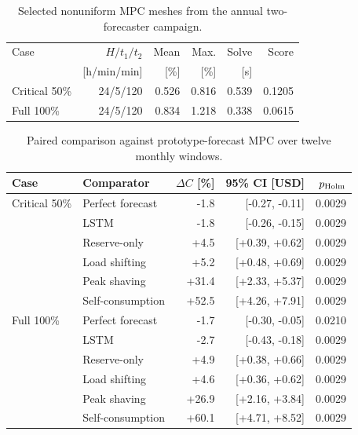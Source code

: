\begin{table}[t]
\centering
\small
\caption{Selected nonuniform MPC meshes from the annual two-forecaster campaign.}
\label{tab:mesh}
\begin{tabular}{lrrrrr}
\toprule
Case & $H/t_1/t_2$ & Mean & Max. & Solve & Score \\
 & [h/min/min] & [\%] & [\%] & [s] & \\
\midrule
Critical 50\% & 24/5/120 & 0.526 & 0.816 & 0.539 & 0.1205 \\
Full 100\% & 24/5/120 & 0.834 & 1.218 & 0.338 & 0.0615 \\
\bottomrule
\end{tabular}
\par{}
\end{table}

\begin{table}[t]
\centering
\small
\caption{Paired comparison against prototype-forecast MPC over twelve monthly windows.}
\label{tab:controller-comparison}
\begin{tabular}{llrrr}
\toprule
Case & Comparator & $\Delta C$ [\%] & 95\% CI [USD] & $p_{\rm Holm}$ \\
\midrule
Critical 50\% & Perfect forecast & -1.8 & [-0.27, -0.11] & 0.0029 \\
 & LSTM & -1.8 & [-0.26, -0.15] & 0.0029 \\
 & Reserve-only & +4.5 & [+0.39, +0.62] & 0.0029 \\
 & Load shifting & +5.2 & [+0.48, +0.69] & 0.0029 \\
 & Peak shaving & +31.4 & [+2.33, +5.37] & 0.0029 \\
 & Self-consumption & +52.5 & [+4.26, +7.91] & 0.0029 \\
Full 100\% & Perfect forecast & -1.7 & [-0.30, -0.05] & 0.0210 \\
 & LSTM & -2.7 & [-0.43, -0.18] & 0.0029 \\
 & Reserve-only & +4.9 & [+0.38, +0.66] & 0.0029 \\
 & Load shifting & +4.6 & [+0.36, +0.62] & 0.0029 \\
 & Peak shaving & +26.9 & [+2.16, +3.84] & 0.0029 \\
 & Self-consumption & +60.1 & [+4.71, +8.52] & 0.0029 \\
\bottomrule
\end{tabular}
\par{}
\end{table}


